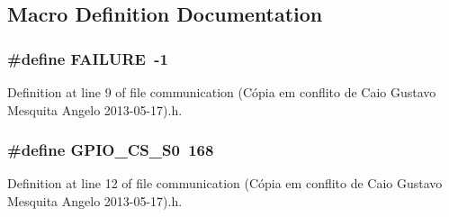 \subsection{Macro Definition Documentation}
\hypertarget{communication_01_07C_xC3_xB3pia_01em_01conflito_01de_01Caio_01Gustavo_01Mesquita_01Angelo_012013-05-17_08_8h_a6d58f9ac447476b4e084d7ca383f5183}{
\subsubsection[{F\-A\-I\-L\-U\-R\-E}]{\setlength{\rightskip}{0pt plus 5cm}\#define F\-A\-I\-L\-U\-R\-E~-\/1}}\label{communication_01_07C_xC3_xB3pia_01em_01conflito_01de_01Caio_01Gustavo_01Mesquita_01Angelo_012013-05-17_08_8h_a6d58f9ac447476b4e084d7ca383f5183}


Definition at line 9 of file communication (\-Cópia em conflito de Caio Gustavo Mesquita Angelo 2013-\/05-\/17).\-h.

\hypertarget{communication_01_07C_xC3_xB3pia_01em_01conflito_01de_01Caio_01Gustavo_01Mesquita_01Angelo_012013-05-17_08_8h_a48ea000c2b251ce26ea35d300f319651}{
\subsubsection[{G\-P\-I\-O\-\_\-\-C\-S\-\_\-\-S0}]{\setlength{\rightskip}{0pt plus 5cm}\#define G\-P\-I\-O\-\_\-\-C\-S\-\_\-\-S0~168}}\label{communication_01_07C_xC3_xB3pia_01em_01conflito_01de_01Caio_01Gustavo_01Mesquita_01Angelo_012013-05-17_08_8h_a48ea000c2b251ce26ea35d300f319651}


Definition at line 12 of file communication (\-Cópia em conflito de Caio Gustavo Mesquita Angelo 2013-\/05-\/17).\-h.



